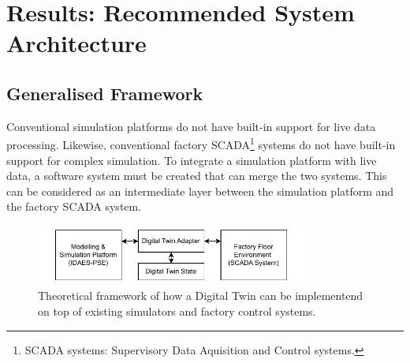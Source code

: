 \chapter{Results: Recommended System Architecture} \label{sec:proposed_architecture}





\section{Generalised Framework}

Conventional simulation platforms do not have built-in support for live data processing. Likewise, conventional factory SCADA\footnote{SCADA systems: Supervisory Data Aquisition and Control systems.} systems do not have built-in support for complex simulation. To integrate a simulation platform with live data, a software system must be created that can merge the two systems. This can be considered as an intermediate layer between the simulation platform and the factory SCADA system.


\begin{figure}[h]
    \centering
    \includegraphics[width=0.8\textwidth]{research_article/research_journal_framework_simple.pdf}
    \caption{Theoretical framework of how a Digital Twin can be implementend on top of existing simulators and factory control systems.}
    \label{fig:theoretical_framework}
\end{figure}

